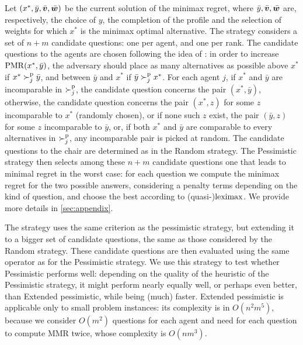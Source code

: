 \documentclass{article}
\begin{document}
Let $(x^{*},\bar{y}, \bar{\bm{v}}, \bar{\bm{w}})$ be the current solution of the minimax regret, where $\bar{y}, \bar{\bm{v}}, \bar{\bm{w}}$ are, respectively, the choice of $y$, the completion of the profile and the selection of weights for which $x^{*}$ is the minimax optimal alternative. 
The  strategy considers a set of $n + m$ candidate questions: one per agent, and one per rank.
The candidate questions to the agents are chosen following the idea of \citet{Lu2011}: in order to increase $\operatorname{PMR}(x^{*},\bar{y})$, the adversary should place as many alternatives as possible above $x^{*}$ if $x^* \succ^\text{p}_j \bar{y}$, and between $\bar{y}$ and $x^{*}$ if $\bar{y} \succ^\text{p}_j x^*$.
For each agent $j$, if $x^*$ and $\bar{y}$ are incomparable in $\succ^\text{p}_j$, the candidate question concerns the pair $(x^*, \bar{y})$, otherwise, the candidate question concerns the pair $(x^*, z)$ for some $z$ incomparable to $x^*$ (randomly chosen), or if none such $z$ exist, the pair $(\bar{y}, z)$ for some $z$ incomparable to $\bar{y}$, or, if both $x^*$ and $\bar{y}$ are comparable to every alternatives in $\succ^\text{p}_j$, any incomparable pair is picked at random. 
The candidate questions to the chair are determined as in the Random strategy.
The Pessimistic strategy then selects among these $n + m$ candidate questions one that leads to minimal regret in the worst case: for each question we compute the minimax regret for the two possible answers, considering a penalty terms depending on the kind of question, and choose the best according to (quasi-)$\operatorname{leximax}$. We provide more details in \cref{sec:appendix}.

The  strategy uses the same criterion as the pessimistic strategy, but extending it to a bigger set of candidate questions, the same as those considered by the Random strategy. These candidate questions are then evaluated using the same operator as for the Pessimistic strategy.
We use this strategy to test whether Pessimistic performs well: depending on the quality of the heuristic of the Pessimistic strategy, it might perform nearly equally well, or perhaps even better, than Extended pessimistic, while being (much) faster. Extended pessimistic is applicable only to small problem instances: its complexity is in $O(n^2 m^5)$, because we consider $O(m^2)$ questions for each agent and need for each question to compute MMR twice, whose complexity is $O(nm^3)$.
\end{document}
